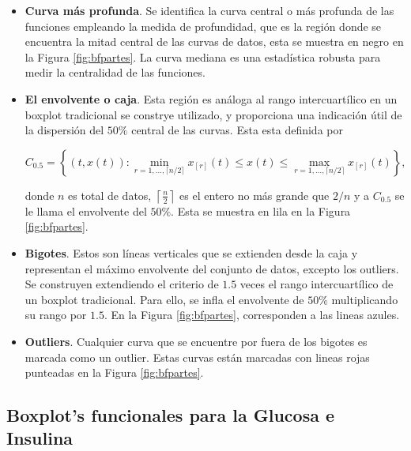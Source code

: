 \begin{itemize}
    \item \textbf{Curva más profunda}. Se identifica la curva central o más profunda de las funciones empleando la medida de profundidad, que es la región donde se encuentra la mitad central de las curvas de datos, esta se muestra en negro en la Figura \ref{fig:bfpartes}. La curva mediana es una estadística robusta para medir la centralidad de las funciones.

    \item \textbf{El envolvente o caja}. Esta región es análoga al rango intercuartílico en un boxplot tradicional se constrye utilizado, y proporciona una indicación útil de la dispersión del $50\%$ central de las curvas. Esta esta definida por

    \begin{equation}
        C_{0.5} = \left\{(t, x(t)): \min _{r=1, \ldots,\lceil n / 2\rceil} x_{[r]}(t) \leq x(t) \leq \max _{r=1, \ldots,\lceil n / 2\rceil} x_{[r]}(t)\right\},
    \end{equation}

    donde $n$ es total de datos, $ \left \lceil \frac{n}{2}\right \rceil$ es el entero no más grande que $2/n$ y a $C_{0.5}$ se le llama el envolvente del $50 \%$. Esta se muestra en lila en la Figura \ref{fig:bfpartes}.
    
    \item \textbf{Bigotes}. Estos son líneas verticales que se extienden desde la caja y representan el máximo envolvente del conjunto de datos, excepto los outliers. Se construyen extendiendo el criterio de $1.5$ veces el rango intercuartílico de un boxplot tradicional. Para ello, se infla el envolvente de $50\%$ multiplicando su rango por $1.5$. En la Figura \ref{fig:bfpartes}, corresponden a las lineas azules.

    \item \textbf{Outliers}. Cualquier curva que se encuentre por fuera de los bigotes es marcada como un outlier. Estas curvas están marcadas con lineas rojas punteadas en la Figura \ref{fig:bfpartes}.
\end{itemize}

\subsection{Boxplot's funcionales para la Glucosa e Insulina}

